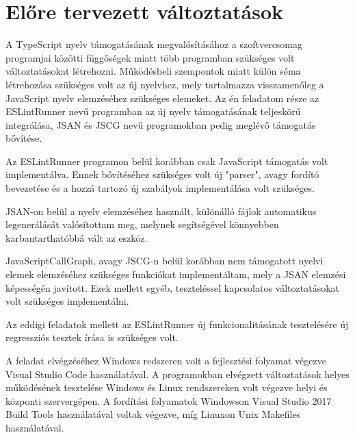 \chapter{Előre tervezett változtatások}
\label{chap:fejezet3}


A TypeScript nyelv támogatásának megvalósításához a szoftvercsomag programjai közötti függőségek miatt több programban szükséges volt változtatásokat létrehozni.
Működésbeli szempontok miatt külön séma létrehozása szükséges volt az új nyelvhez, mely tartalmazza visszamenőleg a JavaScript nyelv elemzéséhez szükséges elemeket.
Az én feladatom része az ESLintRunner nevű programban az új nyelv támogatásának teljeskörű integrálása, JSAN és JSCG nevű programokban pedig meglévő támogatás bővítése.

Az ESLintRunner programon belül korábban csak JavaScript támogatás volt implementálva. Ennek bővítéséhez szükséges volt új "parser", avagy fordító bevezetése és a hozzá tartozó új szabályok implementálása volt szükséges.

JSAN-on belül a nyelv elemzéséhez használt, különálló fájlok automatikus legenerálását valósítottam meg, melynek segítségével könnyebben karbantarthatóbbá vált az eszköz.

JavaScriptCallGraph, avagy JSCG-n belül korábban nem támogatott nyelvi elemek elemzéséhez szükséges funkciókat implementáltam, mely a JSAN elemzési képességén javított.
Ezek mellett egyéb, teszteléssel kapcsolatos változtatásokat volt szükséges implementálni.

Az eddigi feladatok mellett az ESLintRunner új funkcionalitásának tesztelésére új regressziós tesztek írása is szükséges volt.

A feladat elvégzéséhez Windows redszeren volt a fejlesztési folyamat végezve Visual Studio Code használatával. A programokban elvégzett változtatások helyes működésének tesztelése Windows és Linux rendszereken volt végezve helyi és központi szervergépen. A fordítási folyamatok Windowson Visual Studio 2017 Build Tools használatával voltak végezve, míg Linuxon Unix Makefiles használatával.